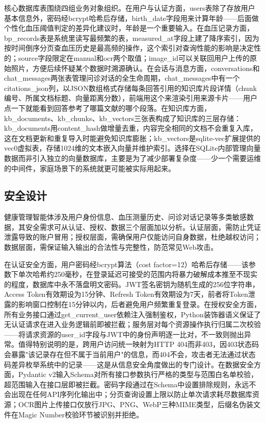 \documentclass[zihao=-4,a4paper]{ctexart}
\begin{document}
核心数据库表围绕四组业务对象组织。在用户与认证方面，users表除了存放用户基本信息外，密码经bcrypt哈希后存储，birth\_date字段用来计算年龄——后面做个性化血压阈值判定的差异化建议时，年龄是一个重要输入。在血压记录方面，bp\_records表是系统里读写最频繁的表，measured\_at字段上建了降序索引，因为按时间倒序分页查血压历史是最高频的操作，这个索引对查询性能的影响是决定性的；source字段限定在manual和ocr两个取值；image\_id可以关联回用户上传的原始照片，方便后续怀疑某个数据时溯源确认。在会话与消息方面，conversations和chat\_messages两张表管理问诊对话的全生命周期，chat\_messages中有一个citations\_json列，以JSON数组格式存储每条回答引用的知识库片段详情（chunk编号、所属文档标题、向量距离分数），前端用这个来渲染引用来源卡片——用户点一下就能看到回答参考了哪篇文献的哪个段落。在知识库方面，kb\_documents、kb\_chunks、kb\_vectors三张表构成了知识库的三层存储：kb\_documents用content\_hash做增量去重，内容完全相同的文档不会重复入库，这在文档更新和重复导入时能避免知识库膨胀；kb\_vectors是sqlite-vec扩展提供的vec0虚拟表，存储1024维的文本嵌入向量并维护索引。选择在SQLite内部管理向量数据而非引入独立的向量数据库，主要是为了减少部署复杂度——少一个需要运维的中间件，家庭场景下的系统就更可能被实际用起来。

\subsection{安全设计}

健康管理智能体涉及用户身份信息、血压测量历史、问诊对话记录等多类敏感数据，其安全需求可从认证、授权、数据三个层面加以分析。认证层面，需防止凭证泄露导致的账户冒用；授权层面，需确保用户仅能访问自身数据，杜绝越权访问；数据层面，需保证输入输出的合法性与完整性，防范常见Web攻击。

在认证安全方面，用户密码经bcrypt算法（cost factor=12）哈希后存储——该参数下单次哈希约250毫秒，在登录延迟可接受的范围内将暴力破解成本推至不现实的程度，数据库中永不落盘明文密码。JWT签名密钥为随机生成的256位字符串，Access Token有效期设为15分钟、Refresh Token有效期设为7天，前者将Token泄露的影响窗口控制在15分钟以内，后者避免用户频繁重复登录。在授权安全方面，所有业务接口通过get\_current\_user依赖注入强制鉴权，Python装饰器语义保证了无认证请求在进入业务逻辑前即被拦截；服务层对每个资源操作执行归属二次校验——将请求资源的user\_id字段与JWT中的身份声明逐一比对，不一致则抛出异常。值得特别说明的是，跨用户访问统一映射为HTTP 404而非403，因403状态码会暴露"该记录存在但不属于当前用户"的信息，而404不会，攻击者无法通过状态码差异枚举系统中的记录——这是从信息安全角度做出的专门设计。在数据安全方面，Pydantic v2输入Schema对所有接口参数执行严格的类型与范围白名单校验，超范围输入在接口层即被拦截。密码字段通过在Schema中设置排除规则，永远不会出现在任何API序列化输出中；分页查询设置上限以防止单次请求耗尽数据库资源；OCR图片上传接口仅放行JPG、PNG、WebP三种MIME类型，后缀名伪装文件在Magic Number校验环节被识别并拒绝。
\end{document}
